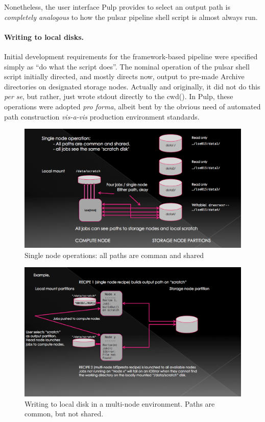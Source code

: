 \documentclass[a4paper,10pt,bibtotoc]{scrartcl}
\begin{document}
Nonetheless, the user interface Pulp provides to select an output path
is \emph{completely analogous} to how the pulsar pipeline shell script
is almost always run.

\paragraph{Writing to local disks.} Initial development requirements
for the framework-based pipeline were specified simply as ``do what
the script does''.  The nominal operation of the pulsar shell script
initially directed, and mostly directs now, output to pre-made Archive
directories on designated storage nodes. Actually and originally, it
did not do this \emph{per se}, but rather, just wrote stdout directly
to the cwd().   In Pulp, these operations were adopted \emph{pro
  forma}, albeit bent by the obvious need of automated path
construction \emph{vis-a-vis} production environment standards.

\begin{figure}[htbp] 
  \begin{center}
    \includegraphics[scale=0.45]{singlenode-0.eps}
  \end{center}
  \caption{Single node operations: all paths are comman and shared}
  \label{fig:singlenode}
\end{figure}

\begin{figure}[htbp] 
  \begin{center}
    \includegraphics[scale=0.45]{fppPic.eps}
  \end{center}
  \caption{Writing to local disk in a multi-node environment.  Paths
    are common, but not  shared.}
  \label{fig:fpppic}
\end{figure}
\end{document}

